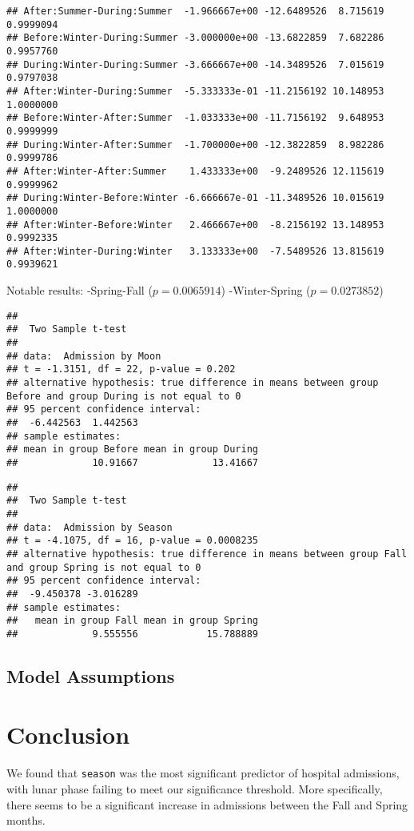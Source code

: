 \documentclass[
]{article}
\begin{document}
\begin{verbatim}
## After:Summer-During:Summer  -1.966667e+00 -12.6489526  8.715619 0.9999094
## Before:Winter-During:Summer -3.000000e+00 -13.6822859  7.682286 0.9957760
## During:Winter-During:Summer -3.666667e+00 -14.3489526  7.015619 0.9797038
## After:Winter-During:Summer  -5.333333e-01 -11.2156192 10.148953 1.0000000
## Before:Winter-After:Summer  -1.033333e+00 -11.7156192  9.648953 0.9999999
## During:Winter-After:Summer  -1.700000e+00 -12.3822859  8.982286 0.9999786
## After:Winter-After:Summer    1.433333e+00  -9.2489526 12.115619 0.9999962
## During:Winter-Before:Winter -6.666667e-01 -11.3489526 10.015619 1.0000000
## After:Winter-Before:Winter   2.466667e+00  -8.2156192 13.148953 0.9992335
## After:Winter-During:Winter   3.133333e+00  -7.5489526 13.815619 0.9939621
\end{verbatim}

Notable results: -Spring-Fall (\(p = 0.0065914\)) -Winter-Spring
(\(p = 0.0273852\))

\begin{verbatim}
## 
##  Two Sample t-test
## 
## data:  Admission by Moon
## t = -1.3151, df = 22, p-value = 0.202
## alternative hypothesis: true difference in means between group Before and group During is not equal to 0
## 95 percent confidence interval:
##  -6.442563  1.442563
## sample estimates:
## mean in group Before mean in group During 
##             10.91667             13.41667
\end{verbatim}

\begin{verbatim}
## 
##  Two Sample t-test
## 
## data:  Admission by Season
## t = -4.1075, df = 16, p-value = 0.0008235
## alternative hypothesis: true difference in means between group Fall and group Spring is not equal to 0
## 95 percent confidence interval:
##  -9.450378 -3.016289
## sample estimates:
##   mean in group Fall mean in group Spring 
##             9.555556            15.788889
\end{verbatim}

\subsection{Model Assumptions}\label{model-assumptions}

\section{Conclusion}\label{conclusion}

We found that \texttt{season} was the most significant predictor of
hospital admissions, with lunar phase failing to meet our significance
threshold. More specifically, there seems to be a significant increase
in admissions between the Fall and Spring months.
\end{document}
